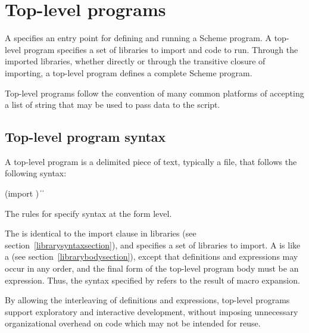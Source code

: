 \chapter{Top-level programs}
\label{programchapter}

A  specifies an entry point for defining and running
a Scheme program.  A top-level program specifies a set of libraries to import and
code to run.  Through the imported libraries, whether directly or through the
transitive closure of importing, a top-level program defines a complete Scheme
program.

Top-level programs follow the convention of many common platforms of accepting 
a list of string  that may be used to
pass data to the script.

\section{Top-level program syntax}

A top-level program is a delimited piece of text, typically a file, that follows
the following syntax:

\begin{grammar}
 \:  
 \: (import )
 \:  
 \: \| 
\> \| 
\end{grammar}

The rules for  specify syntax at the form level.

The  is identical to the import clause in
libraries (see section~\ref{librarysyntaxsection}), 
and specifies a set of libraries to import.  A  is like a  (see
section~\ref{librarybodysection}), except that 
definitions and expressions may occur in any order, and the final
form of the top-level program body must be an expression.  Thus, the syntax
specified by  refers to the result of macro
expansion.

\begin{rationale}
By allowing the interleaving of definitions and expressions, top-level 
programs support exploratory and interactive development, without 
imposing unnecessary organizational overhead on code which may not be 
intended for reuse.
\end{rationale}

